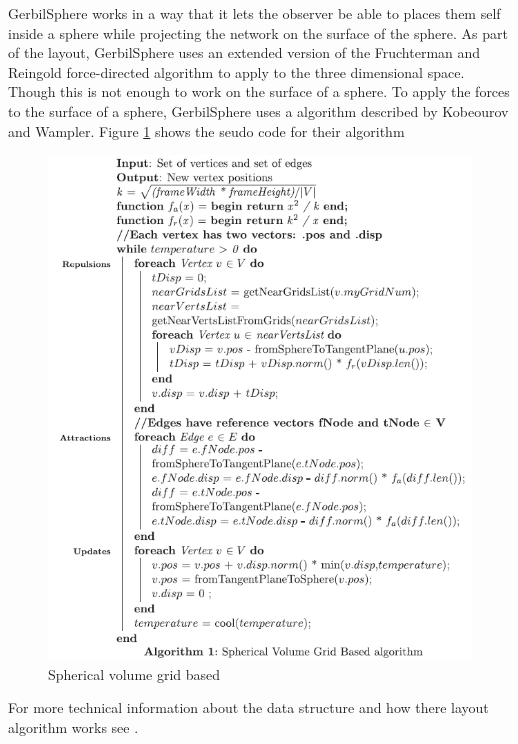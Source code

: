 \documentclass[a4paper,11pt]{kth-mag}
\begin{document}
GerbilSphere works in a way that it lets the observer be able to places them self inside a sphere while projecting the network on the surface of the sphere. As part of the layout, GerbilSphere uses an extended version of the
 Fruchterman and Reingold force-directed algorithm to apply to the three dimensional space. Though this is not enough to work on the surface of a sphere. To apply the forces to the surface of a sphere, GerbilSphere uses a 
 algorithm described by Kobeourov and Wampler\cite{kobourov}. Figure \ref{fig:gerbil_seudo} shows the seudo code for their algorithm
 \begin{figure}[!htbp]
	\centering
	\includegraphics{GerbilSeudo}
	\caption{Spherical volume grid based}
	\label{fig:gerbil_seudo}
\end{figure}
 
 For more technical information about the data structure and how there layout algorithm works see \cite{Shelley20121016}.
\end{document}
